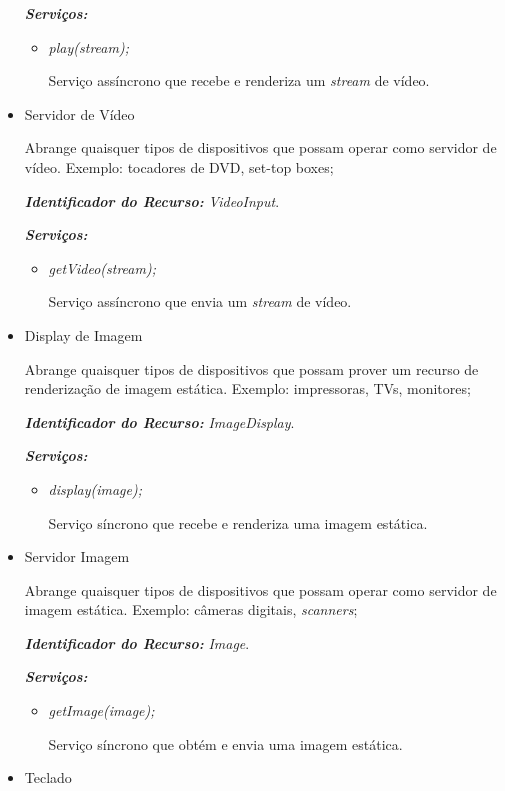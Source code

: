 \begin{itemize}
		\emph{\bf{Serviços:}} 
		\begin{itemize}
			\item \emph{play(stream);}

				Serviço assíncrono que recebe e renderiza um \emph{stream} de vídeo.
		\end{itemize}

	\item Servidor de Vídeo
		
		Abrange quaisquer tipos de dispositivos que possam operar como servidor de vídeo. Exemplo: tocadores de DVD, set-top boxes;

		\emph{\bf{Identificador do Recurso:}} \emph{VideoInput}.

		\emph{\bf{Serviços:}} 
		\begin{itemize}
			\item \emph{getVideo(stream);}

				Serviço assíncrono que envia um \emph{stream} de vídeo.
		\end{itemize}

	\item Display de Imagem
		
		Abrange quaisquer tipos de dispositivos que possam prover um recurso de renderização de imagem estática. Exemplo: impressoras, TVs, monitores;

		\emph{\bf{Identificador do Recurso:}} \emph{ImageDisplay}.

		\emph{\bf{Serviços:}} 
		\begin{itemize}
			\item \emph{display(image);}

				Serviço síncrono que recebe e renderiza uma imagem estática.
		\end{itemize}

	\item Servidor Imagem
		
		Abrange quaisquer tipos de dispositivos que possam operar como servidor de imagem estática. Exemplo: câmeras digitais, \emph{scanners};

		\emph{\bf{Identificador do Recurso:}} \emph{Image}.

		\emph{\bf{Serviços:}} 
		\begin{itemize}
			\item \emph{getImage(image);}

				Serviço síncrono que obtém e envia uma imagem estática.
		\end{itemize}
	\item Teclado
		

\end{itemize}
